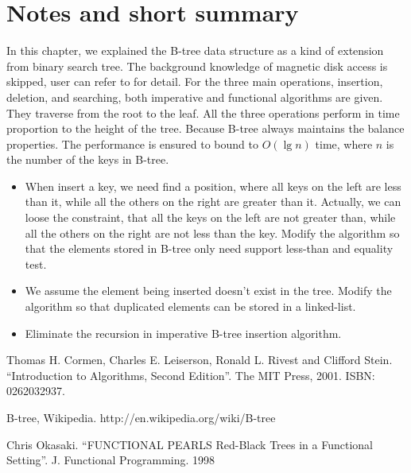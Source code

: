 \documentclass[UTF8]{article}
\begin{document}
\section{Notes and short summary}
In this chapter, we explained the B-tree data structure as a kind of
extension from binary search tree. The background knowledge of
magnetic disk access is skipped, user can refer to \cite{CLRS}
for detail. For the three main operations, insertion, deletion,
and searching, both imperative and functional algorithms are
given. They traverse from the root to the leaf. All the three
operations perform in time proportion to the height of the tree.
Because B-tree always maintains the balance properties. The
performance is ensured to bound to $O(\lg n)$ time,
where $n$ is the number of the keys in B-tree.

\begin{Exercise}
\begin{itemize}
\item When insert a key, we need find a position, where all keys on the left are less than it, while all the others on the right are greater than it. Actually, we can loose the constraint, that all the keys on the left are not greater than, while all the others on the right are not less than the key. Modify the algorithm so that the elements stored in B-tree only need support less-than and equality test.
\item We assume the element being inserted doesn't exist in the tree. Modify the algorithm so that duplicated elements can be stored in a linked-list.
\item Eliminate the recursion in imperative B-tree insertion algorithm.
\end{itemize}
\end{Exercise}

\begin{thebibliography}{99}

Thomas H. Cormen, Charles E. Leiserson, Ronald L. Rivest and Clifford Stein. ``Introduction to Algorithms, Second Edition''. The MIT Press, 2001. ISBN: 0262032937.

B-tree, Wikipedia. http://en.wikipedia.org/wiki/B-tree

Chris Okasaki. ``FUNCTIONAL PEARLS Red-Black Trees in a Functional Setting''. J. Functional Programming. 1998

\end{thebibliography}

\ifx\wholebook\relax \else
\end{document}
